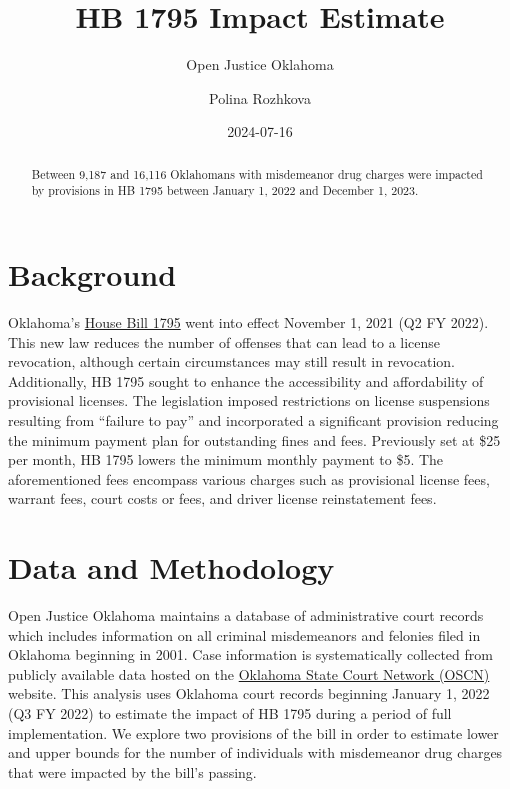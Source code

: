 \documentclass[
  letterpaper,
  DIV=11,
  numbers=noendperiod]{scrartcl}
\title{HB 1795 Impact Estimate}
\subtitle{Open Justice Oklahoma}
\author{Polina Rozhkova}
\date{2024-07-16}
\begin{document}
\maketitle
\begin{abstract}
Between 9,187 and 16,116 Oklahomans with misdemeanor drug charges were
impacted by provisions in HB 1795 between January 1, 2022 and December
1, 2023.
\end{abstract}


\section{Background}\label{background}

Oklahoma's
\href{http://webserver1.lsb.state.ok.us/cf_pdf/2021-22\%20ENR/hB/HB1795\%20ENR.PDF}{House
Bill 1795} went into effect November 1, 2021 (Q2 FY 2022). This new law
reduces the number of offenses that can lead to a license revocation,
although certain circumstances may still result in revocation.
Additionally, HB 1795 sought to enhance the accessibility and
affordability of provisional licenses. The legislation imposed
restrictions on license suspensions resulting from ``failure to pay''
and incorporated a significant provision reducing the minimum payment
plan for outstanding fines and fees. Previously set at \$25 per month,
HB 1795 lowers the minimum monthly payment to \$5. The aforementioned
fees encompass various charges such as provisional license fees, warrant
fees, court costs or fees, and driver license reinstatement fees.

\section{Data and Methodology}\label{data-and-methodology}

Open Justice Oklahoma maintains a database of administrative court
records which includes information on all criminal misdemeanors and
felonies filed in Oklahoma beginning in 2001. Case information is
systematically collected from publicly available data hosted on the
\href{https://www.oscn.net/v4/}{Oklahoma State Court Network (OSCN)}
website. This analysis uses Oklahoma court records beginning January 1,
2022 (Q3 FY 2022) to estimate the impact of HB 1795 during a period of
full implementation. We explore two provisions of the bill in order to
estimate lower and upper bounds for the number of individuals with
misdemeanor drug charges that were impacted by the bill's passing.
\end{document}
